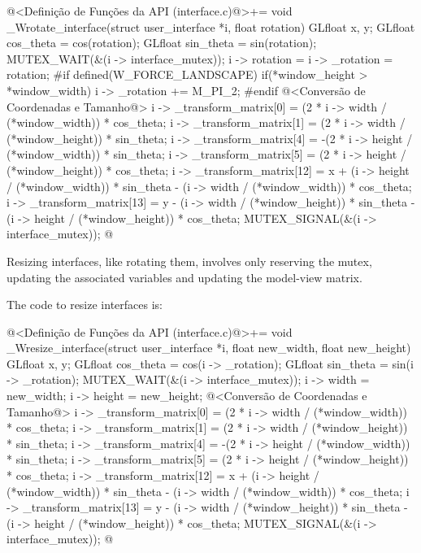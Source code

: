 \iniciocodigo
@<Definição de Funções da API (interface.c)@>+=
void _Wrotate_interface(struct user_interface *i, float rotation){
  GLfloat x, y;
  GLfloat cos_theta = cos(rotation);
  GLfloat sin_theta = sin(rotation);
  MUTEX_WAIT(&(i -> interface_mutex));
  i -> rotation = i -> _rotation = rotation;
#if defined(W_FORCE_LANDSCAPE)
  if(*window_height > *window_width)
    i -> _rotation += M_PI_2;
#endif 
  @<Conversão de Coordenadas e Tamanho@>
  i -> _transform_matrix[0] = (2 * i -> width / (*window_width)) *
    cos_theta;
  i -> _transform_matrix[1] = (2 * i -> width / (*window_height)) *
    sin_theta;
  i -> _transform_matrix[4] = -(2 * i -> height / (*window_width)) *
     sin_theta;
  i -> _transform_matrix[5] = (2 * i -> height / (*window_height)) *
    cos_theta;
  i -> _transform_matrix[12] = x +
    (i -> height / (*window_width)) * sin_theta -
    (i -> width / (*window_width)) * cos_theta;
  i -> _transform_matrix[13] = y -
    (i -> width / (*window_height)) * sin_theta -
    (i -> height / (*window_height)) * cos_theta;
  MUTEX_SIGNAL(&(i -> interface_mutex));
}
@
\fimcodigo


Resizing interfaces, like rotating them, involves only reserving the
mutex, updating the associated variables and updating the model-view
matrix.

The code to resize interfaces is:

\iniciocodigo
@<Definição de Funções da API (interface.c)@>+=
void _Wresize_interface(struct user_interface *i,
                        float new_width, float new_height){
  GLfloat x, y;
  GLfloat cos_theta = cos(i -> _rotation);
  GLfloat sin_theta = sin(i -> _rotation);
  MUTEX_WAIT(&(i -> interface_mutex));
  i -> width = new_width;
  i -> height = new_height;
  @<Conversão de Coordenadas e Tamanho@>
  i -> _transform_matrix[0] = (2 * i -> width / (*window_width)) *
    cos_theta;
  i -> _transform_matrix[1] = (2 * i -> width / (*window_height)) *
    sin_theta;
  i -> _transform_matrix[4] = -(2 * i -> height / (*window_width)) *
     sin_theta;
  i -> _transform_matrix[5] = (2 * i -> height / (*window_height)) *
    cos_theta;
  i -> _transform_matrix[12] = x +
    (i -> height / (*window_width)) * sin_theta -
    (i -> width / (*window_width)) * cos_theta;
  i -> _transform_matrix[13] = y -
    (i -> width / (*window_height)) * sin_theta -
    (i -> height / (*window_height)) * cos_theta;
  MUTEX_SIGNAL(&(i -> interface_mutex));
}
@
\fimcodigo


